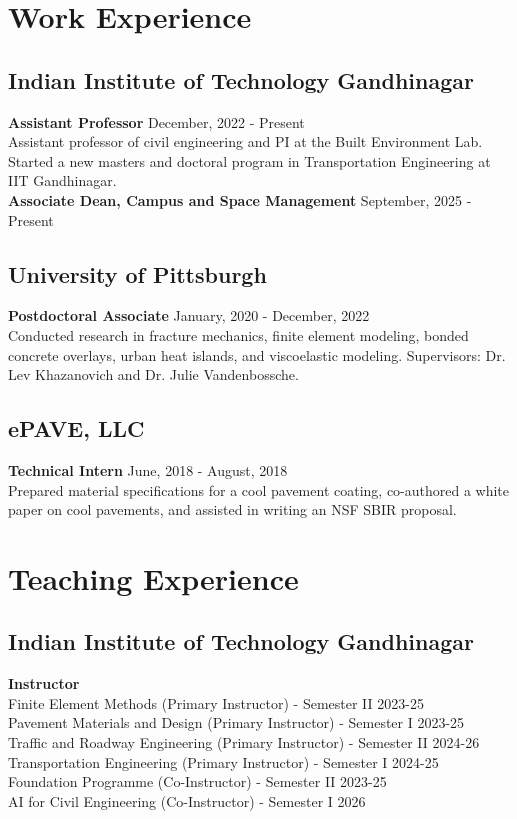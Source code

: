 \documentclass[12pt]{article}
\begin{document}
\bigskip
\section*{Work Experience}
\hfill
\subsection*{Indian Institute of Technology Gandhinagar}
\textbf{Assistant Professor} \hfill December, 2022 - Present \\
Assistant professor of civil engineering and PI at the Built Environment Lab. Started a new masters and doctoral program in Transportation Engineering at IIT Gandhinagar. \\

\textbf{Associate Dean, Campus and Space Management} \hfill September, 2025 - Present \\

\subsection*{University of Pittsburgh}
\textbf{Postdoctoral Associate} \hfill January, 2020 - December, 2022 \\
Conducted research in fracture mechanics, finite element modeling, bonded concrete overlays, urban heat islands, and viscoelastic modeling. Supervisors: Dr. Lev Khazanovich and Dr. Julie Vandenbossche.\\

\subsection*{ePAVE, LLC}
\textbf{Technical Intern} \hfill June, 2018 - August, 2018 \\
Prepared material specifications for a cool pavement coating, co-authored a white paper on cool pavements, and assisted in writing an NSF SBIR proposal. 

\bigskip
\section*{Teaching Experience}
\hfill
\subsection*{Indian Institute of Technology Gandhinagar}
\textbf{Instructor}\\
Finite Element Methods (Primary Instructor) - Semester II 2023-25 \\
Pavement Materials and Design (Primary Instructor) - Semester I 2023-25 \\
Traffic and Roadway Engineering (Primary Instructor) - Semester II 2024-26 \\
Transportation Engineering (Primary Instructor) - Semester I 2024-25 \\
Foundation Programme (Co-Instructor) - Semester II 2023-25 \\ 
AI for Civil Engineering (Co-Instructor) - Semester I 2026
\end{document}
